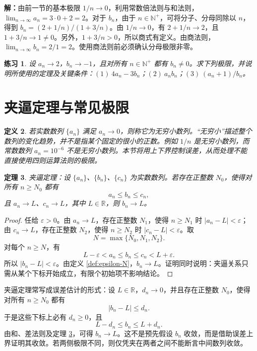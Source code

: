 \documentclass[UTF8,fontset=fandol,11pt]{ctexart}
\newtheorem{definition}{定义}[section]
\newtheorem{theorem}[definition]{定理}
\newtheorem{exercise}[definition]{练习}
\begin{document}
\par\noindent\textbf{解：}由前一节的基本极限 $1/n\to0$，利用常数倍法则与和法则，$\lim_{n\to\infty}a_n=3\cdot0+2=2$。对于 $b_n$，由于 $n\in\mathbb{N}^{+}$，可将分子、分母同除以 $n$，得到 $b_n=(2+1/n)/(1+3/n)$。由 $1/n\to0$，有 $2+1/n\to2$，且 $1+3/n\to1\neq0$。另外，$1+3/n>0$，所以商式有定义。由商法则，$\lim_{n\to\infty}b_n=2/1=2$。使用商法则前必须确认分母极限非零。\par
\begin{exercise}
\label{mathagent:exercise:8760977b7c41a7ab2d82304ea81f33749e9976ddafc1f87583b542c4b8793254}
设 $a_n\to2$，$b_n\to-1$，且对所有 $n\in\mathbb{N}^{+}$ 都有 $b_n\neq0$。求下列极限，并说明所使用的定理及关键条件：$(1)\ 4a_n-3b_n$；$(2)\ a_nb_n$；$(3)\ (a_n+1)/b_n$。
\end{exercise}
\section{夹逼定理与常见极限}\label{sec:S03}
\begin{definition}
若实数数列 $\{a_n\}$ 满足 $a_n\to0$，则称它为无穷小数列。“无穷小”描述整个数列的变化趋势，并不是指某个固定的很小的正数。例如 $1/n$ 是无穷小数列，而常数数列 $a_n=10^{-6}$ 不是无穷小数列。本节将用上下界控制误差，从而处理不能直接使用四则运算法则的极限。
\end{definition}
\begin{theorem}
\label{thm:squeeze-sequence}夹逼定理：设 $\{a_n\}$、$\{b_n\}$、$\{c_n\}$ 为实数数列。若存在正整数 $N_0$，使得对所有 $n\geq N_0$ 都有
\[
a_n\leq b_n\leq c_n,
\]
且 $a_n\to L$、$c_n\to L$，其中 $L\in\mathbb{R}$，则 $b_n\to L$。
\end{theorem}
\begin{proof}
任给 $\varepsilon>0$。由 $a_n\to L$，存在正整数 $N_1$，使得 $n\geq N_1$ 时 $|a_n-L|<\varepsilon$；由 $c_n\to L$，存在正整数 $N_2$，使得 $n\geq N_2$ 时 $|c_n-L|<\varepsilon$。取
\[
N=\max\{N_0,N_1,N_2\}.
\]
对每个 $n\geq N$，有
\[
L-\varepsilon<a_n\leq b_n\leq c_n<L+\varepsilon.
\]
所以 $|b_n-L|<\varepsilon$。由定义 \ref{def:epsilon-N}，$b_n\to L$。证明同时说明：夹逼关系只需从某个下标开始成立，有限个初始项不影响结论。
\end{proof}
夹逼定理常写成误差估计的形式：设 $L\in\mathbb{R}$，$d_n\to0$，并且存在正整数 $N_0$，使得对所有 $n\geq N_0$ 都有
\[
|b_n-L|\leq d_n.
\]
于是这些下标上必有 $d_n\geq0$，且
\[
L-d_n\leq b_n\leq L+d_n.
\]
由和、差法则及定理 \ref{thm:squeeze-sequence}，可得 $b_n\to L$。这不是预先假设 $b_n$ 收敛，而是借助误差上界证明其收敛。若两侧极限不同，则仅凭夹在两者之间不能断言中间数列收敛。\par
\end{document}

